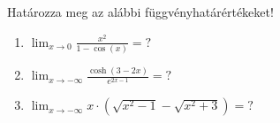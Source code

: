 \documentclass[11pt]{scrartcl}
\begin{document}
Határozza meg az alábbi függvényhatárértékeket!
\begin{enumerate}
	\item \(\displaystyle
	      \lim_{x \to 0} \frac{x^2}{1 - \cos(x)} = ?
	      \)

	\item \(\displaystyle
	      \lim_{x \to -\infty} \frac{\cosh(3 - 2x)}{e^{2x - 1}} = ?
	      \)

	\item \(\displaystyle
	      \lim_{x \to -\infty} x \cdot \left(
	      \sqrt{x^2 - 1} - \sqrt{x^2 + 3}
	      \right) = ?
	      \)
\end{enumerate}
\end{document}
